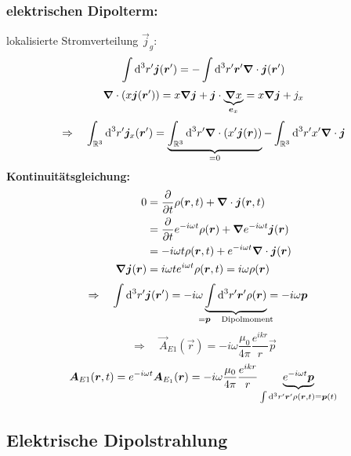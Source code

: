 \subsubsection{elektrischen Dipolterm:}

lokalisierte Stromverteilung $ \vec{j}_g $:
\begin{equation*}
\int \textrm{d}^3 r' \bm{j}(\bm{r}') = - \int \textrm{d}^3 r' \bm{r}' \bm{\nabla} \cdot \bm{j}(\bm{r}')
\end{equation*}
\begin{equation*}
\bm{\nabla} \cdot ( x \bm{j}(\bm{r}')) = x \bm{\nabla} \bm{j} + \bm{j} \cdot \underbrace{\bm{\nabla} x}_{\bm{e}_x} = x \bm{\nabla} \bm{j} + j_x
\end{equation*}
\begin{equation*}
\Rightarrow \quad \int_{\mathbb{R}^3} \textrm{d}^3 r' \bm{j}_x(\bm{r}') = \underbrace{\int_{\mathbb{R}^3} \textrm{d}^3 r' \bm{\nabla} \cdot \left(x' \bm{j}(\bm{r})\right)}_{= 0} - \int_{\mathbb{R}^3} \textrm{d}^3 r' x' \bm{\nabla} \cdot \bm{j}
\end{equation*}
\textbf{Kontinuitätsgleichung:}
\begin{align*}
0 &= \frac{\partial }{\partial t} \rho(\bm{r},t) + \bm{\nabla} \cdot \bm{j}(\bm{r},t)\\
&= \frac{\partial }{\partial t} e^{-i\omega t} \rho(\bm{r}) + \bm{\nabla} e^{-i\omega t} \bm{j}(\bm{r})\\
&= - i \omega t \rho(\bm{r},t) + e^{- i \omega t} \bm{\nabla} \cdot \bm{j}(\bm{r})\\
\bm{\nabla} \bm{j}(\bm{r}) &= i \omega t e^{i \omega t} \rho(\bm{r},t) = i \omega \rho(\bm{r})
\end{align*}
\begin{align*}
\Rightarrow \quad \int \dd^3 r' \vec{j}(\vec{r}') &= - i \omega \ub{\int \dd^3 r' \vec{r}' \rho(\vec{r})}_{\mathclap{= \vec{p} \quad \tx{Dipolmoment}}} = - i \omega \vec{p}
\end{align*}
\begin{equation*}
\Rightarrow \quad \vec{A}_{E1} (\vec{r}) = - i \omega \frac{\mu_0}{4 \pi} \frac{e^{i k r}}{r} \vec{p}
\end{equation*}
\begin{equation*}
\bm{A}_{E1} (\bm{r},t) = e^{- i \omega t} \bm{A}_{E_1}(\bm{r}) = - i \omega \frac{\mu_0}{4 \pi} \frac{e^{i k r}}{r} \underbrace{e^{- i \omega t} \bm{p}}_{\int \textrm{d}^3 r' \bm{r}' \rho(\bm{r},t) = \bm{p}(t)}
\end{equation*}

\subsection{Elektrische Dipolstrahlung}

